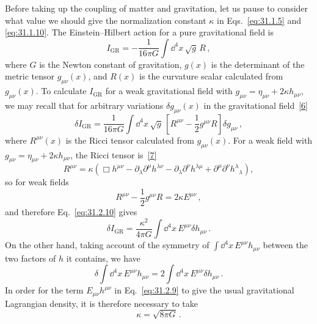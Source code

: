 Before taking up the coupling of matter and gravitation, let us pause to
consider what value we should give the normalization constant \(\kappa\) in
Eqs.~\eqref{eq:31.1.5} and \eqref{eq:31.1.10}. The Einstein--Hilbert action
for a pure gravitational field is
\begin{equation}
  I_{\mathrm{GR}}
  =-\frac{1}{16\pi G}\int \dd^4x\,\sqrt{g}\,R\,,
  \tag{31.2.10}\label{eq:31.2.10}
\end{equation}
where \(G\) is the Newton constant of gravitation, \(g(x)\) is the determinant
of the metric tensor \(g_{\mu\nu}(x)\), and \(R(x)\) is the curvature scalar
calculated from \(g_{\mu\nu}(x)\). To calculate \(I_{\mathrm{GR}}\) for a weak
gravitational field with
\(g_{\mu\nu}=\eta_{\mu\nu}+2\kappa h_{\mu\nu}\), we may recall that for
arbitrary variations \(\delta g_{\mu\nu}(x)\) in the gravitational
field~\hyperref[ch31-ref-6]{[6]}
\begin{equation}
  \delta I_{\mathrm{GR}}
  =\frac{1}{16\pi G}\int \dd^4x\,\sqrt{g}\,
   \left[R^{\mu\nu}-\frac12g^{\mu\nu}R\right]\delta g_{\mu\nu}\,,
  \tag{31.2.11}\label{eq:31.2.11}
\end{equation}
where \(R^{\mu\nu}(x)\) is the Ricci tensor calculated from
\(g_{\mu\nu}(x)\). For a weak field with
\(g_{\mu\nu}=\eta_{\mu\nu}+2\kappa h_{\mu\nu}\), the Ricci tensor
is~\hyperref[ch31-ref-7]{[7]}
\begin{equation}
  R^{\mu\nu}
  =\kappa\left(
     \Box h^{\mu\nu}
     -\partial_\lambda\partial^\mu h^{\lambda\nu}
     -\partial_\lambda\partial^\nu h^{\lambda\mu}
     +\partial^\mu\partial^\nu h^\lambda{}_\lambda
   \right),
  \tag{31.2.12}\label{eq:31.2.12}
\end{equation}
so for weak fields
\begin{equation}
  R^{\mu\nu}-\frac12g^{\mu\nu}R=2\kappa E^{\mu\nu}\,,
  \tag{31.2.13}\label{eq:31.2.13}
\end{equation}
and therefore Eq.~\eqref{eq:31.2.10} gives
\[
  \delta I_{\mathrm{GR}}
  =\frac{\kappa^2}{4\pi G}
   \int \dd^4x\,E^{\mu\nu}\delta h_{\mu\nu}\,.
\]
On the other hand, taking account of the symmetry of
\(\int \dd^4x\,E^{\mu\nu}h_{\mu\nu}\) between the two factors of \(h\) it
contains, we have
\[
  \delta\int \dd^4x\,E^{\mu\nu}h_{\mu\nu}
  =2\int \dd^4x\,E^{\mu\nu}\delta h_{\mu\nu}\,.
\]
In order for the term \(E_{\mu\nu}h^{\mu\nu}\) in
Eq.~\eqref{eq:31.2.9} to give the usual gravitational Lagrangian density, it
is therefore necessary to take
\begin{equation}
  \kappa=\sqrt{8\pi G}\,.
  \tag{31.2.14}\label{eq:31.2.14}
\end{equation}

